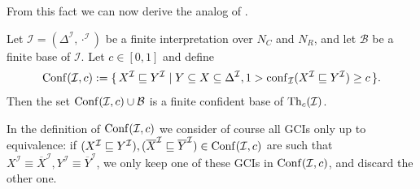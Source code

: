 From this fact we can now derive the analog of .

\begin{Theorem}
  \label{thm:conf-base}
  Let $\mathcal{I} = (\Delta^{\mathcal{I}}, \cdot^{\mathcal{I}})$ be a finite
  interpretation over $N_C$ and $N_R$, and let $\mathcal{B}$ be a finite base of
  $\mathcal{I}$.  Let $c \in [0,1]$ and define
  \begin{equation*}
    \operatorname{Conf}(\mathcal{I}, c) := {\{\, X^{\mathcal{I}} \sqsubseteq Y^{\mathcal{I}} \mid Y
      \subseteq X \subseteq \Delta^{\mathcal{I}}, 1 > \operatorname{conf}_{\mathcal{I}}( X^{\mathcal{I}}
      \sqsubseteq Y^{\mathcal{I}} ) \ge c \,\}}.
  \end{equation*}
  Then the set $\operatorname{Conf}(\mathcal{I}, c) \cup \mathcal{B}$ is a finite confident base of
  $\operatorname{Th}_c(\mathcal{I})$.
\end{Theorem}

In the definition of $\operatorname{Conf}(\mathcal{I}, c)$ we consider of course all GCIs only up to
equivalence: if $(X^{\mathcal{I}} \sqsubseteq Y^{\mathcal{I}}), (\overline X^{\mathcal{I}}
\sqsubseteq \overline Y^{\mathcal{I}}) \in \operatorname{Conf}(\mathcal{I}, c)$ are such that
$X^{\mathcal{I}} \equiv \overline X^{\mathcal{I}}, Y^{\mathcal{I}} \equiv \overline
Y^{\mathcal{I}}$, we only keep one of these GCIs in $\operatorname{Conf}(\mathcal{I}, c)$, and discard
the other one.

